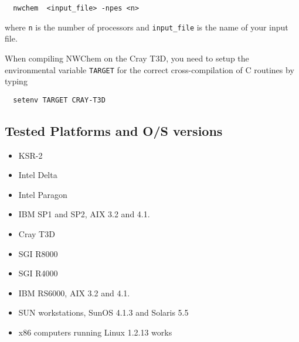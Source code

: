 \begin{verbatim}
  nwchem  <input_file> -npes <n>
\end{verbatim}

where \verb+n+ is the number of processors and \verb+input_file+ is the
name of your input file.

When compiling NWChem on the Cray T3D, you need to setup the
environmental variable {\tt TARGET} for the correct cross-compilation
of C routines by typing
\begin{verbatim}
  setenv TARGET CRAY-T3D
\end{verbatim}

\subsection{Tested Platforms and O/S versions}

\begin{itemize}
\item KSR-2 
\item Intel Delta 
\item Intel Paragon 
\item IBM SP1 and SP2, AIX 3.2 and 4.1.
\item Cray T3D
\item SGI R8000
\item SGI R4000
\item IBM RS6000, AIX 3.2 and 4.1.
\item SUN workstations, SunOS 4.1.3 and Solaris 5.5
\item x86 computers running Linux 1.2.13
works
\end{itemize}
